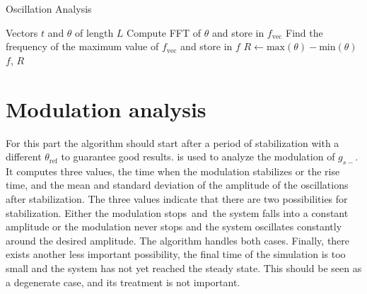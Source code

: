 \begin{algorithm}
    \caption{Oscillation Analysis}
    \begin{algorithmic}[1]
        \Require Vectors $t$ and $\theta$ of length $L$
        \State Compute FFT of $\theta$ and store in $f_\text{vec}$
        \State Find the frequency of the maximum value of $f_\text{vec}$ and store in $f$
        \State $R \gets \text{max}\left(\theta\right) - \text{min}\left(\theta\right)$ 
        \State \Return $f$, $R$
    \end{algorithmic}
    \label{alg:oscillation}
\end{algorithm}

\section{Modulation analysis}

For this part the algorithm should start after a period of stabilization with a different $\theta_\text{ref}$ to guarantee good results.
 is used to analyze the modulation of $g_{s-}$.
It computes three values, the time when the modulation stabilizes or the rise time, and the mean and standard deviation of the amplitude of the oscillations after stabilization.
The three values indicate that there are two possibilities for stabilization.
Either the modulation stops and the system falls into a constant amplitude or the modulation never stops and the system oscillates constantly around the desired amplitude.
The algorithm handles both cases.
Finally, there exists another less important possibility, the final time of the simulation is too small and the system has not yet reached the steady state.
This should be seen as a degenerate case, and its treatment is not important.

